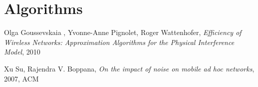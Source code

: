 \documentclass[a4paper,draft,12pt]{report}
\begin{document}
\chapter{Algorithms}

\begin{thebibliography}{9}

Olga Goussevskaia , Yvonne-Anne
Pignolet, Roger Wattenhofer,
\emph{Efficiency of Wireless Networks:
Approximation Algorithms
for the Physical Interference Model},
2010

Xu Su, Rajendra V. Boppana,
\emph{On the impact of noise on mobile ad hoc networks},
2007, ACM

\end{thebibliography}
\end{document}
